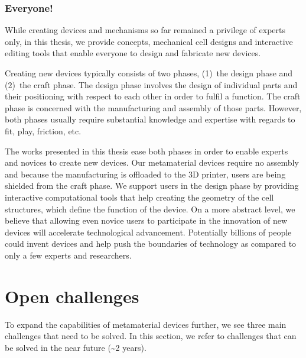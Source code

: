 


\subsubsection{Everyone!}
While creating devices and mechanisms so far remained a privilege of experts only, in this thesis, we provide concepts, mechanical cell designs and interactive editing tools that enable everyone to design and fabricate new devices. 

Creating new devices typically consists of two phases, (1)~the design phase and (2)~the craft phase. The design phase involves the design of individual parts and their positioning with respect to each other in order to fulfil a function. The craft phase is concerned with the manufacturing and assembly of those parts. However, both phases usually require substantial knowledge and expertise with regards to fit, play, friction, etc. 

The works presented in this thesis ease both phases in order to enable experts and novices to create new devices. Our metamaterial devices require no assembly and because the manufacturing is offloaded to the 3D printer, users are being shielded from the craft phase. We support users in the design phase by providing interactive computational tools that help creating the geometry of the cell structures, which define the function of the device.
On a more abstract level, we believe that allowing even novice users to participate in the innovation of new devices will accelerate technological advancement. Potentially billions of people could invent devices and help push the boundaries of technology as compared to only a few experts and researchers. 


\section{Open challenges}

To expand the capabilities of metamaterial devices further, we see three main challenges that need to be solved. In this section, we refer to challenges that can be solved  in the near future (\textasciitilde{}2 years).

